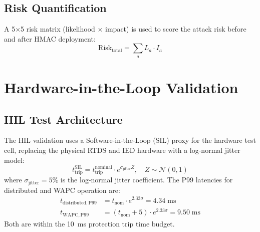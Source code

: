 \subsection{Risk Quantification}

A 5$\times$5 risk matrix (likelihood $\times$ impact) is used to
score the attack risk before and after HMAC deployment:
\begin{equation}
  \mathrm{Risk}_\mathrm{total} = \sum_a L_a \cdot I_a
  \label{eq:ch9_risk}
\end{equation}

\section{Hardware-in-the-Loop Validation}
\label{sec:ch9_hil}

\subsection{HIL Test Architecture}

The HIL validation uses a Software-in-the-Loop (SIL) proxy for the
hardware test cell, replacing the physical RTDS and IED hardware with
a log-normal jitter model:
\begin{equation}
  t_\mathrm{trip}^\mathrm{SIL} = t_\mathrm{trip}^\mathrm{nominal}
    \cdot e^{\sigma_\mathrm{jitter} Z}, \quad Z \sim \mathcal{N}(0, 1)
  \label{eq:ch9_sil_jitter}
\end{equation}
where $\sigma_\mathrm{jitter} = 5\%$ is the log-normal jitter coefficient.
The P99 latencies for distributed and WAPC operation are:
\begin{align}
  t_\mathrm{distributed,P99} &= t_\mathrm{nom} \cdot e^{2.33 \sigma} = 4.34\;\mathrm{ms}
  \label{eq:ch9_distributed_p99} \\
  t_\mathrm{WAPC,P99} &= (t_\mathrm{nom} + 5) \cdot e^{2.33 \sigma} = 9.50\;\mathrm{ms}
  \label{eq:ch9_wapc_p99}
\end{align}
Both are within the 10~ms protection trip time budget.

